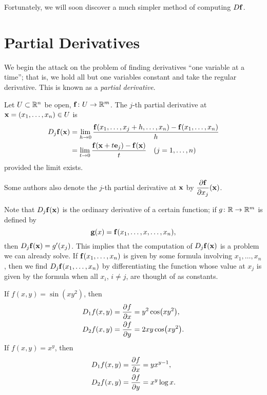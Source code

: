 Fortunately, we will soon discover a much simpler method of computing $D\vb{f}$.
\pagebreak

\section{Partial Derivatives}
We begin the attack on the problem of finding derivatives ``one variable at a time''; that is, we hold all but one variables constant and take the regular derivative. This is known as a \emph{partial derivative}.

\begin{definition}
Let $U\subset\mathbb R^n$ be open, $\vb{f}\colon U\to\mathbb R^m$. The $j$-th partial derivative at $\vb{x}=(x_1,\dots,x_n)\in U$ is
\begin{align*}
D_j\vb{f}(\vb{x})&=\lim_{h\to0}\frac{\vb{f}(x_1,\dots,x_j+h,\dots,x_n)-\vb{f}(x_1,\dots,x_n)}{h}\\
&=\lim_{t\to0}\frac{\vb{f}(\vb{x}+t\vb{e}_j)-\vb{f}(\vb{x})}{t}\quad(j=1,\dots,n)
\end{align*}
provided the limit exists.
\end{definition}

\begin{notation}
Some authors also denote the $j$-th partial derivative at $\vb{x}$ by $\displaystyle\pdv{\vb{f}}{x_j}(\vb{x})$.
\end{notation}

Note that $D_j\vb{f}(\vb{x})$ is the ordinary derivative of a certain function; if $g\colon\mathbb R\to\mathbb R^m$ is defined by
\[\vb{g}(x)=\vb{f}(x_1,\dots,x,\dots,x_n),\]
then $D_j\vb{f}(\vb{x})=g^\prime(x_j)$. 
This implies that the computation of $D_j\vb{f}(\vb{x})$ is a problem we can already solve.
If $\vb{f}(x_1,\dots,x_n)$ is given by some formula involving $x_1,\dots,x_n$, then we find $D_j\vb{f}(x_1,\dots,x_n)$ by differentiating the function whose value at $x_j$ is given by the formula when all $x_i$, $i\neq j$, are thought of as constants.

\begin{example}
If $f(x,y)=\sin(xy^2)$, then
\begin{align*}
D_1 f(x,y)&=\pdv{f}{x}=y^2\cos(xy^2),\\
D_2 f(x,y)&=\pdv{f}{y}=2xy\cos(xy^2).
\end{align*}
If $f(x,y)=x^y$, then
\begin{align*}
D_1 f(x,y)&=\pdv{f}{x}=yx^{y-1},\\
D_2 f(x,y)&=\pdv{f}{y}=x^y\log x.
\end{align*}
\end{example}

